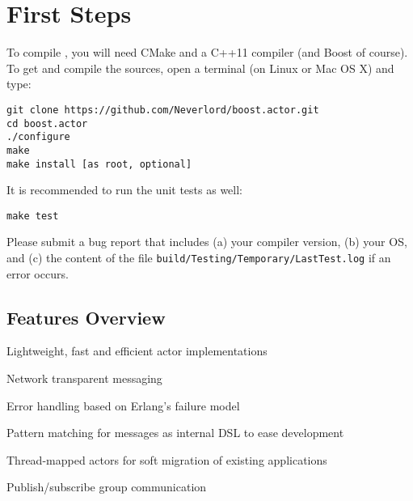 \section{First Steps}



To compile \ba, you will need CMake and a C++11 compiler (and Boost of course). To get and compile the sources, open a terminal (on Linux or Mac OS X) and type:

\begin{verbatim}
git clone https://github.com/Neverlord/boost.actor.git
cd boost.actor
./configure
make
make install [as root, optional]
\end{verbatim}

It is recommended to run the unit tests as well:

\begin{verbatim}
make test
\end{verbatim}

Please submit a bug report that includes (a) your compiler version, (b) your OS, and (c) the content of the file \texttt{build/Testing/Temporary/LastTest.log} if an error occurs.

\subsection{Features Overview}

\begin{itemize*}
  \item Lightweight, fast and efficient actor implementations
  \item Network transparent messaging
  \item Error handling based on Erlang's failure model
  \item Pattern matching for messages as internal DSL to ease development
  \item Thread-mapped actors for soft migration of existing applications
  \item Publish/subscribe group communication
\end{itemize*}



